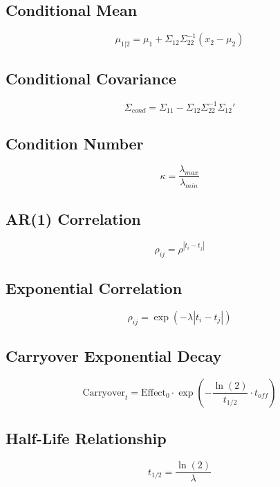 \documentclass[11pt]{article}
\theoremstyle{definition}
\begin{document}
\subsection{Conditional Mean}
\begin{equation}
\mu_{1|2} = \mu_1 + \Sigma_{12} \Sigma_{22}^{-1} (x_2 - \mu_2)
\end{equation}

\subsection{Conditional Covariance}
\begin{equation}
\Sigma_{cond} = \Sigma_{11} - \Sigma_{12} \Sigma_{22}^{-1} \Sigma_{12}'
\end{equation}

\subsection{Condition Number}
\begin{equation}
\kappa = \frac{\lambda_{max}}{\lambda_{min}}
\end{equation}

\subsection{AR(1) Correlation}
\begin{equation}
\rho_{ij} = \rho^{|t_i - t_j|}
\end{equation}

\subsection{Exponential Correlation}
\begin{equation}
\rho_{ij} = \exp(-\lambda |t_i - t_j|)
\end{equation}

\subsection{Carryover Exponential Decay}
\begin{equation}
\text{Carryover}_t = \text{Effect}_0 \cdot \exp\left(-\frac{\ln(2)}{t_{1/2}}
\cdot t_{off}\right)
\end{equation}

\subsection{Half-Life Relationship}
\begin{equation}
t_{1/2} = \frac{\ln(2)}{\lambda}
\end{equation}
\end{document}
